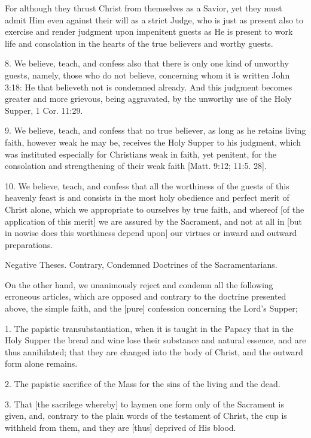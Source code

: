 For although they thrust Christ from themselves as a Savior, yet they must admit Him even against their will as a strict Judge, who is just as present also to exercise and render judgment upon impenitent guests as He is present to work life and consolation in the hearts of the true believers and worthy guests.

8. We believe, teach, and confess also that there is only one kind of unworthy guests, namely, those who do not believe, concerning whom it is written John 3:18: He that believeth not is condemned already. And this judgment becomes greater and more grievous, being aggravated, by the unworthy use of the Holy Supper, 1 Cor. 11:29.

9. We believe, teach, and confess that no true believer, as long as he retains living faith, however weak he may be, receives the Holy Supper to his judgment, which was instituted especially for Christians weak in faith, yet penitent, for the consolation and strengthening of their weak faith [Matt. 9:12; 11:5. 28].

10. We believe, teach, and confess that all the worthiness of the guests of this heavenly feast is and consists in the most holy obedience and perfect merit of Christ alone, which we appropriate to ourselves by true faith, and whereof [of the application of this merit] we are assured by the Sacrament, and not at all in [but in nowise does this worthiness depend upon] our virtues or inward and outward preparations.

Negative Theses.
Contrary, Condemned Doctrines of the Sacramentarians.

On the other hand, we unanimously reject and condemn all the following erroneous articles, which are opposed and contrary to the doctrine presented above, the simple faith, and the [pure] confession concerning the Lord's Supper;

1. The papistic transubstantiation, when it is taught in the Papacy that in the Holy Supper the bread and wine lose their substance and natural essence, and are thus annihilated; that they are changed into the body of Christ, and the outward form alone remains.

2. The papistic sacrifice of the Mass for the sins of the living and the dead.

3. That [the sacrilege whereby] to laymen one form only of the Sacrament is given, and, contrary to the plain words of the testament of Christ, the cup is withheld from them, and they are [thus] deprived of His blood.

